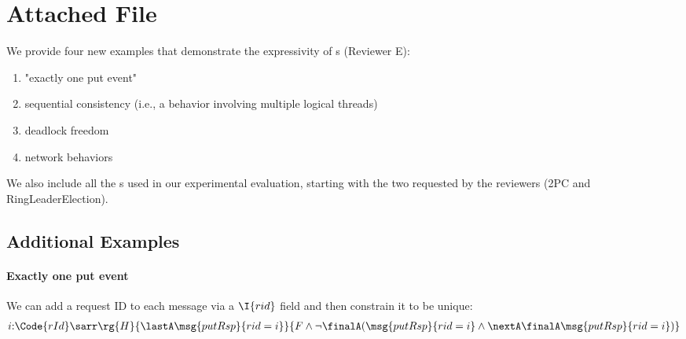 
\section{Attached File}

We provide four new examples that demonstrate the expressivity
of \PAT{}s (Reviewer E):
\begin{enumerate}
\item "exactly one put event"

\item sequential consistency (i.e., a behavior involving multiple
  logical threads)

\item deadlock freedom

\item network behaviors
\end{enumerate}
We also include all the \PAT{}s used in our experimental evaluation,
starting with the two requested by the reviewers (2PC and
RingLeaderElection).

\subsection{Additional Examples}

\paragraph{Exactly one put event} We can add a request ID to each
message via a \(\I{rid}\) field and then constrain it to be unique:
{\small\begin{align*}
    i{:}\Code{rId} \sarr \rg{H}{\lastA \msg{putRsp}{rid = i}}{F \land \neg \finalA (\msg{putRsp}{rid = i} \land \nextA \finalA \msg{putRsp}{rid = i})}
\end{align*}}

